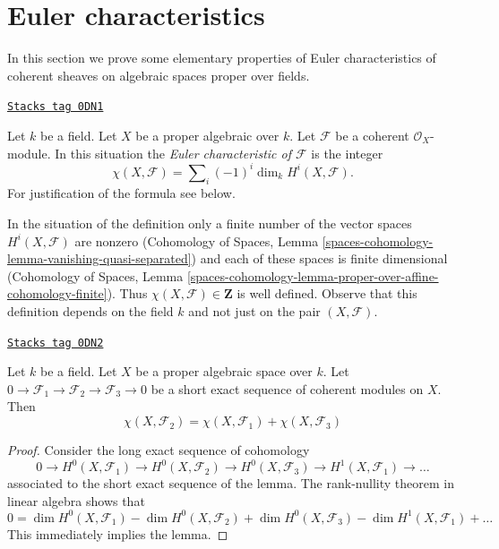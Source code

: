 \section{Euler characteristics}
\label{spaces-over-fields-section-euler}
In this section we prove some elementary properties of Euler characteristics
of coherent sheaves on algebraic spaces proper over fields.

\begin{definition}
\label{spaces-over-fields-definition-euler-characteristic}
\href{https://stacks.math.columbia.edu/tag/0DN1}{\texttt{Stacks tag 0DN1}}

Let $k$ be a field. Let $X$ be a proper algebraic over $k$. Let $\mathcal{F}$
be a coherent $\mathcal{O}_X$-module. In this situation the
{\it Euler characteristic of $\mathcal{F}$} is the integer
$$
\chi(X, \mathcal{F}) = \sum\nolimits_i (-1)^i \dim_k H^i(X, \mathcal{F}).
$$
For justification of the formula see below.
\end{definition}

In the situation of the definition only a finite number of the vector spaces
$H^i(X, \mathcal{F})$ are nonzero (Cohomology of Spaces, Lemma
\ref{spaces-cohomology-lemma-vanishing-quasi-separated})
and each of these spaces is finite dimensional
(Cohomology of Spaces, Lemma
\ref{spaces-cohomology-lemma-proper-over-affine-cohomology-finite}). Thus
$\chi(X, \mathcal{F}) \in \mathbf{Z}$ is well defined. Observe that
this definition depends on the field $k$ and not just on the pair
$(X, \mathcal{F})$.

\begin{lemma}
\label{spaces-over-fields-lemma-euler-characteristic-additive}
\href{https://stacks.math.columbia.edu/tag/0DN2}{\texttt{Stacks tag 0DN2}}

Let $k$ be a field. Let $X$ be a proper algebraic space over $k$.
Let $0 \to \mathcal{F}_1 \to \mathcal{F}_2 \to \mathcal{F}_3 \to 0$
be a short exact sequence of coherent modules on $X$. Then
$$
\chi(X, \mathcal{F}_2) = \chi(X, \mathcal{F}_1) + \chi(X, \mathcal{F}_3)
$$
\end{lemma}

\begin{proof}
Consider the long exact sequence of cohomology
$$
0 \to H^0(X, \mathcal{F}_1) \to H^0(X, \mathcal{F}_2) \to
H^0(X, \mathcal{F}_3) \to H^1(X, \mathcal{F}_1) \to \ldots
$$
associated to the short exact sequence of the lemma. The rank-nullity theorem
in linear algebra shows that
$$
0 = \dim H^0(X, \mathcal{F}_1) - \dim H^0(X, \mathcal{F}_2)
+ \dim H^0(X, \mathcal{F}_3) - \dim H^1(X, \mathcal{F}_1) + \ldots
$$
This immediately implies the lemma.
\end{proof}

